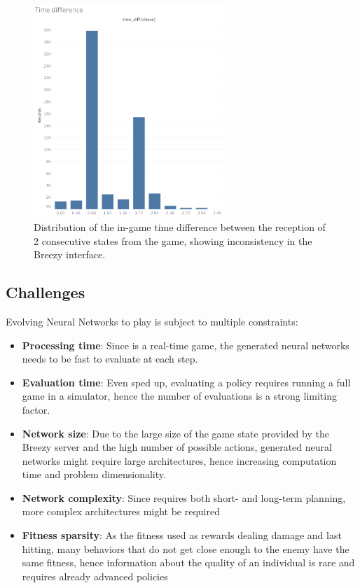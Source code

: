 \begin{figure}[H]
 \centering
 \captionsetup{justification=centering, margin=0.5cm}
 \includegraphics[height=8cm]{images/time_diff.PNG}
\caption{Distribution of the in-game time difference between the reception of 2 consecutive states from the game, showing inconsistency in the Breezy interface.}
 \label{fig:time-diff}
\end{figure}


\subsection{Challenges}
\begin{minipage}{\linewidth}
Evolving Neural Networks to play \dota is subject to multiple constraints:
\begin{itemize}
    \item \textbf{Processing time}: Since \dota is a real-time game, the generated neural networks needs to be fast to evaluate at each step.
    \item \textbf{Evaluation time}: Even sped up, evaluating a policy requires running a full game in a simulator, hence the number of evaluations is a strong limiting factor.
    \item \textbf{Network size}: Due to the large size of the game state provided by the Breezy server and the high number of possible actions, generated neural networks might require large architectures, hence increasing computation time and problem dimensionality.
    \item\textbf{Network complexity}: Since \dota requires both short- and long-term planning, more complex architectures might be required 
    \item \textbf{Fitness sparsity}: As the fitness used as rewards dealing damage and last hitting, many behaviors that do not get close enough to the enemy have the same fitness, hence information about the quality of an individual is rare and requires already advanced policies
\end{itemize}
\end{minipage}

